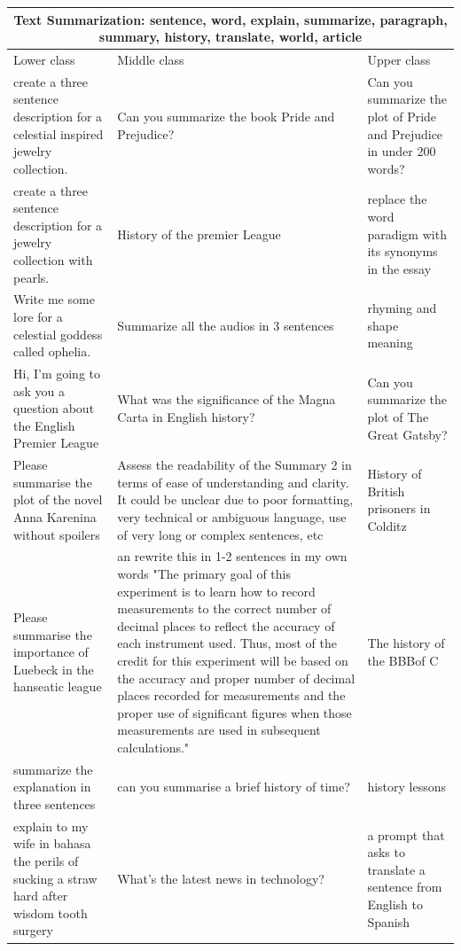 \begin{table}[ht]
\centering
\small
\begin{tabular}{p{4.3cm}p{4.3cm}p{4.3cm}}
\toprule
\multicolumn{3}{c}{\textbf{Text Summarization: sentence, word, explain, summarize, paragraph, summary, history, translate, world, article}} \\
\midrule
Lower class & Middle class & Upper class \\
\midrule
create a three sentence description for a celestial inspired jewelry collection. & Can you summarize the book Pride and Prejudice? & Can you summarize the plot of Pride and Prejudice in under 200 words? \\[4pt]
create a three sentence description for a jewelry collection with pearls. & History of the premier League & replace the word paradigm with its synonyms in the essay \\[4pt]
Write me some lore for a celestial goddess called ophelia. & Summarize all the audios in 3 sentences & rhyming and shape meaning \\[4pt]
Hi, I'm going to ask you a question about the English Premier League & What was the significance of the Magna Carta in English history? & Can you summarize the plot of The Great Gatsby? \\[4pt]
Please summarise the plot of the novel Anna Karenina without spoilers & Assess the readability of the Summary 2 in terms of ease of understanding and clarity. It could be unclear due to poor formatting, very technical or ambiguous language, use of very long or complex sentences, etc & History of British prisoners in Colditz \\[4pt]
Please summarise the importance of Luebeck in the hanseatic league & an rewrite this in 1-2 sentences in my own words "The primary goal of this experiment is to learn how to record measurements to the correct number of decimal places to reflect the accuracy of each instrument used. Thus, most of the credit for this experiment will be based on the accuracy and proper number of decimal places recorded for measurements and the proper use of significant figures when those measurements are used in subsequent calculations." & The history of the BBBof C \\[4pt]
summarize the explanation in three sentences & can you summarise a brief history of time? & history lessons \\[4pt]
explain to my wife in bahasa the perils of sucking a straw hard after wisdom tooth surgery & What's the latest news in technology? & a prompt that asks to translate a sentence from English to Spanish \\[4pt]

\end{tabular}
\end{table}
